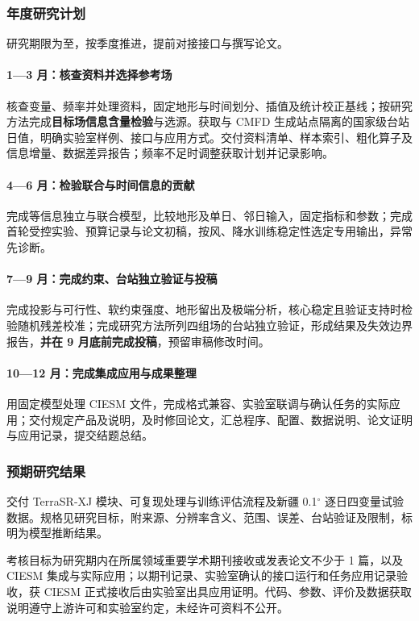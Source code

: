 \subsubsection{年度研究计划}

研究期限为至，按季度推进，提前对接接口与撰写论文。

\paragraph{1—3 月：核查资料并选择参考场}
核查变量、频率并处理资料，固定地形与时间划分、插值及统计校正基线；按研究方法完成\textbf{目标场信息含量检验}与选源。获取与 CMFD 生成站点隔离的国家级台站日值，明确实验室样例、接口与应用方式。交付资料清单、样本索引、粗化算子及信息增量、数据差异报告；频率不足时调整获取计划并记录影响。

\paragraph{4—6 月：检验联合与时间信息的贡献}
完成等信息独立与联合模型，比较地形及单日、邻日输入，固定指标和参数；完成首轮受控实验、预算记录与论文初稿，按风、降水训练稳定性选定专用输出，异常先诊断。

\paragraph{7—9 月：完成约束、台站独立验证与投稿}
完成投影与可行性、软约束强度、地形留出及极端分析，核心稳定且验证支持时检验随机残差校准；完成研究方法所列四组场的台站独立验证，形成结果及失效边界报告，\textbf{并在 9 月底前完成投稿}，预留审稿修改时间。

\paragraph{10—12 月：完成集成应用与成果整理}
用固定模型处理 CIESM 文件，完成格式兼容、实验室联调与确认任务的实际应用；交付规定产品及说明，及时修回论文，汇总程序、配置、数据说明、论文证明与应用记录，提交结题总结。

\subsubsection{预期研究结果}

交付 TerraSR-XJ 模块、可复现处理与训练评估流程及新疆 0.1$^{\circ}$ 逐日四变量试验数据。规格见研究目标，附来源、分辨率含义、范围、误差、台站验证及限制，标明为模型推断结果。

考核目标为研究期内在所属领域重要学术期刊接收或发表论文不少于 1 篇，以及 CIESM 集成与实际应用；以期刊记录、实验室确认的接口运行和任务应用记录验收，获 CIESM 正式接收后由实验室出具应用证明。代码、参数、评价及数据获取说明遵守上游许可和实验室约定，未经许可资料不公开。
